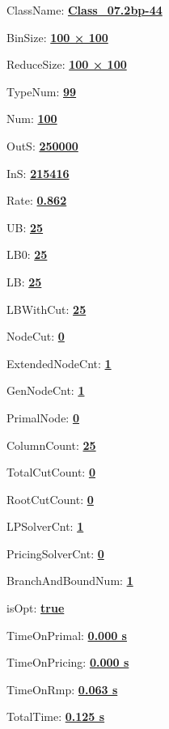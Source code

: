 \documentclass[11pt]{article}
\begin{document}
\pagestyle{empty}


ClassName: \underline{\textbf{Class_07.2bp-44}}
\par
BinSize: \underline{\textbf{100 × 100}}
\par
ReduceSize: \underline{\textbf{100 × 100}}
\par
TypeNum: \underline{\textbf{99}}
\par
Num: \underline{\textbf{100}}
\par
OutS: \underline{\textbf{250000}}
\par
InS: \underline{\textbf{215416}}
\par
Rate: \underline{\textbf{0.862}}
\par
UB: \underline{\textbf{25}}
\par
LB0: \underline{\textbf{25}}
\par
LB: \underline{\textbf{25}}
\par
LBWithCut: \underline{\textbf{25}}
\par
NodeCut: \underline{\textbf{0}}
\par
ExtendedNodeCnt: \underline{\textbf{1}}
\par
GenNodeCnt: \underline{\textbf{1}}
\par
PrimalNode: \underline{\textbf{0}}
\par
ColumnCount: \underline{\textbf{25}}
\par
TotalCutCount: \underline{\textbf{0}}
\par
RootCutCount: \underline{\textbf{0}}
\par
LPSolverCnt: \underline{\textbf{1}}
\par
PricingSolverCnt: \underline{\textbf{0}}
\par
BranchAndBoundNum: \underline{\textbf{1}}
\par
isOpt: \underline{\textbf{true}}
\par
TimeOnPrimal: \underline{\textbf{0.000 s}}
\par
TimeOnPricing: \underline{\textbf{0.000 s}}
\par
TimeOnRmp: \underline{\textbf{0.063 s}}
\par
TotalTime: \underline{\textbf{0.125 s}}
\par
\newpage


\end{document}
